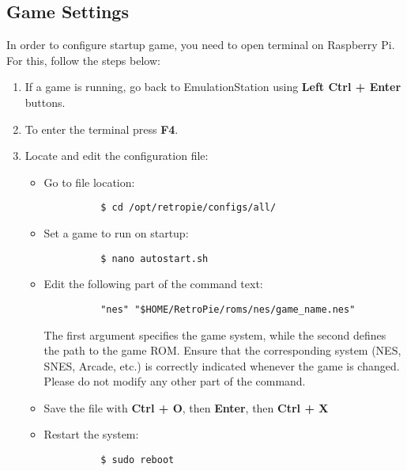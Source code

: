 \subsection{Game Settings}
\label{subsec:game_settings}

In order to configure startup game, you need to open terminal on Raspberry Pi. For this, follow the steps below:

\begin{enumerate}
  \item If a game is running, go back to EmulationStation using \textbf{Left Ctrl + Enter} buttons.
  \item To enter the terminal press \textbf{F4}.
  \item Locate and edit the configuration file:
    \begin{itemize}
      \item Go to file location:
        \begin{verbatim}
          $ cd /opt/retropie/configs/all/
        \end{verbatim}
      \item Set a game to run on startup:
        \begin{verbatim}
          $ nano autostart.sh
        \end{verbatim}
      \item Edit the following part of the command text:
        \begin{verbatim}
          "nes" "$HOME/RetroPie/roms/nes/game_name.nes"
        \end{verbatim}
      The first argument specifies the game system, while the second defines the path to the game ROM. Ensure that the corresponding system (NES, SNES, Arcade, etc.) is correctly indicated whenever the game is changed. Please do not modify any other part of the command.
      \item Save the file with \textbf{Ctrl + O}, then \textbf{Enter}, then \textbf{Ctrl + X}
      \item Restart the system:
        \begin{verbatim}
          $ sudo reboot
        \end{verbatim}

    \end{itemize}
\end{enumerate}


